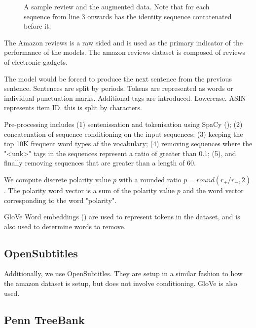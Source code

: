 \documentclass[12pt,twoside]{report}
\begin{document}
\begin{figure}[!ht]
	\centering
	
	
	\caption{A sample review and the augmented data. Note that for each sequence from line 3 onwards has the identity sequence contatenated before it. \label{aug_1}}
	\end{figure}

The Amazon reviews is a raw sided and is used as the primary indicator of the performance of the models. The amazon reviews dataset is composed of reviews of electronic gadgets.

The model would be forced to produce the next sentence from the previous sentence. Sentences are split by periods. Tokens are represented as words or individual punctuation marks. Additional tags are introduced. Lowercase. ASIN represents item ID. this is split by characters.


Pre-processing includes (1) sentenissation and tokenisation using SpaCy (\cite{honnibal_spacy_2017}); (2) concatenation of sequence conditioning on the input sequences; (3) keeping the top 10K frequent word types af the vocabulary; (4) removing sequences where the "<unk>" tags in the sequences represent a ratio of greater than 0.1; (5), and finally removing sequences that are greater than a length of 60. 

We compute discrete polarity value $p$ with a rounded ratio $p=round(r_{+}/r_{-},2)$. The polarity word vector is a sum of the polarity value $p$ and the word vector corresponding to the word "polarity".


GloVe Word embeddings (\cite{pennington_glove:_2014}) are used to represent tokens in the dataset, and is also used to determine words to remove. 



\subsection{OpenSubtitles}

Additionally, we use OpenSubtitles. They are setup in a similar fashion to how the amazon dataset is setup, but does not involve conditioning. GloVe is also used. 


\subsection{Penn TreeBank}
\end{document}
